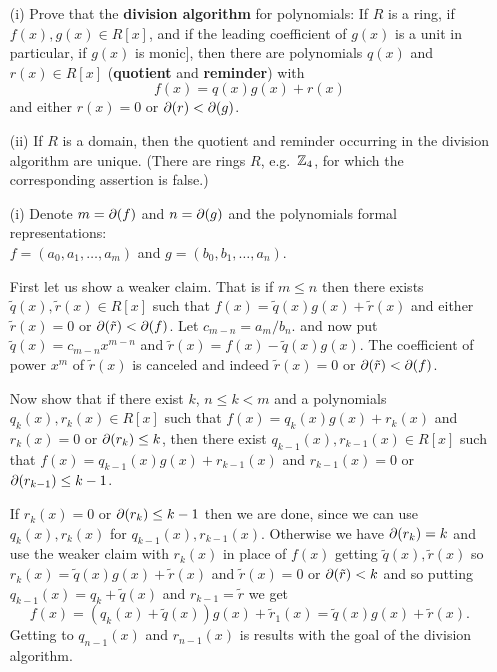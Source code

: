 \begin{myenumerate}
\item
\begin{excopy}
\begin{itemize}
 \item[(i)]
   Prove that the
   \textbf{division algorithm} for polynomials: If $R$ is a ring,
   if \(f(x),g(x)\in R[x]\), and if the leading coefficient of \(g(x)\) is
   a unit in particular, if \(g(x)\) is monic], then there are polynomials
   \(q(x)\) and \(r(x)\in R[x]\) (\textbf{quotient} and \textbf{reminder}) with
   \[f(x) = q(x)g(x) + r(x)\]
   and either \(r(x)=0\) or \(\partial(r)<\partial(g)\).
 \item[(ii)]
   If $R$ is a domain, then the quotient and reminder occurring in the
   division algorithm are unique. (There are rings $R$, e.g.\ \(\mathbb{Z}_4\),
   for which the corresponding assertion is false.)
\end{itemize}
\end{excopy}

\begin{itemize}
 \item[(i)]
    Denote
    \(m=\partial(f)\) and  \(n=\partial(g)\) and the polynomials formal
    representations:\\
    \(f=(a_0,a_1,\ldots,a_m)\) and
    \(g=(b_0,b_1,\ldots,a_n)\).

    First let us show a weaker claim. That is
    if \(m\leq n\) then there exists \(\tilde{q}(x),\tilde{r}(x)\in R[x]\)
    such that \(f(x) = \tilde{q}(x)g(x) + \tilde{r}(x)\)
    and either \(\tilde{r}(x)=0\) or \(\partial(\tilde{r})<\partial(f)\).
    Let \(c_{m-n}=a_m/b_n.\) and now put \(\tilde{q}(x)=c_{m-n}x^{m-n}\)
    and \(\tilde{r}(x)=f(x)-\tilde{q}(x)g(x)\).
    The  coefficient of power \(x^m\) of  \(\tilde{r}(x)\) is canceled
    and indeed   \(\tilde{r}(x)=0\) or \(\partial(\tilde{r})<\partial(f)\).

    Now show that if there exist $k$, \(n\leq k<m\) and
    a polynomials \(q_k(x),r_k(x)\in R[x]\)
    such that \(f(x) = q_k(x)g(x) + r_k(x)\) and
    \(r_k(x)=0\) or \(\partial(r_k)\leq k\),
    then  there exist \(q_{k-1}(x),r_{k-1}(x)\in R[x]\)
    such that \(f(x) = q_{k-1}(x)g(x) + r_{k-1}(x)\) and
    \(r_{k-1}(x)=0\) or \(\partial(r_{k-1})\leq k-1\).

    If \(r_k(x)=0\) or \(\partial(r_k)\leq k-1\)
    then we are done, since we can use \(q_k(x),r_k(x)\)
    for  \(q_{k-1}(x),r_{k-1}(x)\).
    Otherwise we have \(\partial(r_k)=k\) and use the weaker claim
    with \(r_k(x)\) in place of \(f(x)\)
    getting \(\tilde{q}(x),\tilde{r}(x)\) so
    \(r_k(x)=\tilde{q}(x)g(x)+\tilde{r}(x)\) and \(\tilde{r}(x)=0\) or
    \(\partial(\tilde{r})<k\) and so putting \(q_{k-1}(x)=q_k+\tilde{q}(x)\)
    and \(r_{k-1}=\tilde{r}\) we get
    \[f(x) = (q_k(x)+\tilde{q}(x))g(x)+\tilde{r}_1(x) =
             \tilde{q}(x)g(x)+\tilde{r}(x).\]
    Getting to \(q_{n-1}(x)\) and \(r_{n-1}(x)\)
    is results with the goal of the division algorithm.


\end{itemize}
\end{myenumerate}

